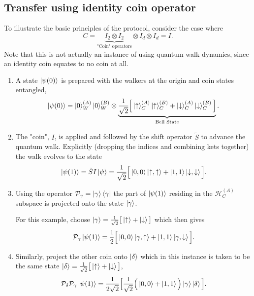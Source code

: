 \subsection{Transfer using identity coin operator}
\label{subsection:qw_transfer}
To illustrate the basic principles of the protocol, consider the case where 
\begin{equation}
    C = \underbrace{I_2 \otimes I_2}_{\text{"Coin" operators}} \otimes I_d \otimes I_d = I.
\end{equation}
Note that this is not actually an instance of using quantum walk dynamics, since an identity coin equates to no coin at all.

\begin{enumerate}
    \item A state $\ket{\psi(0)}$ is prepared with the walkers at the origin and coin states entangled,
    \begin{equation}
        \ket{\psi(0)} = \ket{0}^{(A)}_W\ket{0}^{(B)}_W \otimes \underbrace{\frac{1}{\sqrt{2}}\Big [\ket{\uparrow}^{(A)}_C\ket{\uparrow}^{(B)}_C + \ket{\downarrow}^{(A)}_C\ket{\downarrow}^{(B)}_C \Big]}_{\text{Bell State}}.
    \end{equation}
    \item The "coin", $I$, is applied and followed by the shift operator $\tilde{S}$ to advance the quantum walk.
    Explicitly (dropping the indices and combining kets together) the walk evolves to the state
    \begin{equation}
        \ket{\psi(1)} = \tilde{S}I\ket{\psi} = \frac{1}{\sqrt{2}}\Big [\ket{0,0}\ket{\uparrow,\uparrow} + \ket{1,1}\ket{\downarrow,\downarrow}\Big].
    \end{equation}
    \item Using the operator $\mathcal{P}_{\gamma} = \ket{\gamma}\bra{\gamma}$ the part of $\ket{\psi(1)}$ residing in the $\mathcal{H}^{(A)}_C$ subspace is projected onto the state $\ket{\gamma}$.
    
    For this example, choose $\ket{\gamma} = \frac{1}{\sqrt{2}} \big [\ket{\uparrow} + \ket{\downarrow} \big]$ which then gives
    \begin{equation}
        \mathcal{P}_\gamma \ket{\psi(1)} = \frac{1}{2}\Big [\ket{0, 0}\ket{\gamma,\uparrow} + \ket{1, 1}\ket{\gamma, \downarrow}\Big ].
    \end{equation}
    \item Similarly, project the other coin onto $\ket{\delta}$ which in this instance is taken to be the same state $\ket{\delta} = \frac{1}{\sqrt{2}} \big [\ket{\uparrow} + \ket{\downarrow} \big]$,
    \begin{equation}
        \mathcal{P}_\delta \mathcal{P}_\gamma \ket{\psi(1)} = \frac{1}{2\sqrt{2}}\Big [\frac{1}{\sqrt{2}}\Big (\ket{0, 0} + \ket{1, 1}\Big )\ket{\gamma}\ket{\delta}\Big].
    \end{equation}
\end{enumerate}
